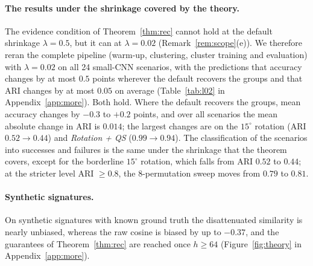 \paragraph{The results under the shrinkage covered by the theory.} The evidence condition of Theorem~\ref{thm:rec} cannot hold at the default shrinkage $\lambda=0.5$, but it can at $\lambda=0.02$ (Remark~\ref{rem:scope}(e)). We therefore reran the complete pipeline (warm-up, clustering, cluster training and evaluation) with $\lambda=0.02$ on all 24 small-CNN scenarios, with the predictions that accuracy changes by at most $0.5$ points wherever the default recovers the groups and that ARI changes by at most $0.05$ on average (Table~\ref{tab:l02} in Appendix~\ref{app:more}). Both hold. Where the default recovers the groups, mean accuracy changes by $-0.3$ to $+0.2$ points, and over all scenarios the mean absolute change in ARI is $0.014$; the largest changes are on the $15^\circ$ rotation (ARI $0.52\to0.44$) and \emph{Rotation + QS} ($0.99\to0.94$). The classification of the scenarios into successes and failures is the same under the shrinkage that the theorem covers, except for the borderline $15^\circ$ rotation, which falls from ARI $0.52$ to $0.44$; at the stricter level ARI $\ge0.8$, the 8-permutation sweep moves from $0.79$ to $0.81$.

\paragraph{Synthetic signatures.} On synthetic signatures with known ground truth the disattenuated similarity is nearly unbiased, whereas the raw cosine is biased by up to $-0.37$, and the guarantees of Theorem~\ref{thm:rec} are reached once $h\ge64$ (Figure~\ref{fig:theory} in Appendix~\ref{app:more}).
